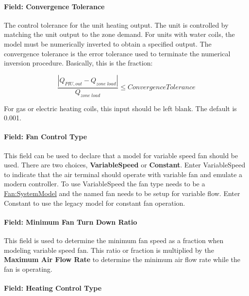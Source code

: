 \paragraph{Field: Convergence Tolerance}\label{field-convergence-tolerance-4}

The control tolerance for the unit heating output. The unit is controlled by matching the unit output to the zone demand. For units with water coils, the model must be numerically inverted to obtain a specified output. The convergence tolerance is the error tolerance used to terminate the numerical inversion procedure. Basically, this is the fraction:

\begin{equation}
\frac{{\left| {{Q_{PIU,out}} - {Q_{zone\;load}}} \right|}}{{{Q_{zone\;load}}}} \le ConvergenceTolerance
\end{equation}

For gas or electric heating coils, this input should be left blank. The default is 0.001.

\paragraph{Field: Fan Control Type}\label{field-fan-control-type-parallelPIU}

This field can be used to declare that a model for variable speed fan should be used. There are two choices, \textbf{VariableSpeed} or \textbf{Constant}.  Enter VariableSpeed to indicate that the air terminal should operate with variable fan and emulate a modern controller. To use VariableSpeed the fan type needs to be a \hyperref[fansystemmodel]{Fan:SystemModel} and the named fan needs to be setup for variable flow. Enter Constant to use the legacy model for constant fan operation.

\paragraph{Field: Minimum Fan Turn Down Ratio}\label{field-fan-turn-down-ratio-parallelPIU}

This field is used to determine the minimum fan speed as a fraction when modeling variable speed fan. This ratio or fraction is multiplied by the \textbf{Maximum Air Flow Rate} to determine the minimum air flow rate while the fan is operating.

\paragraph{Field: Heating Control Type}\label{field-heat-control-type-parallelPIU}

